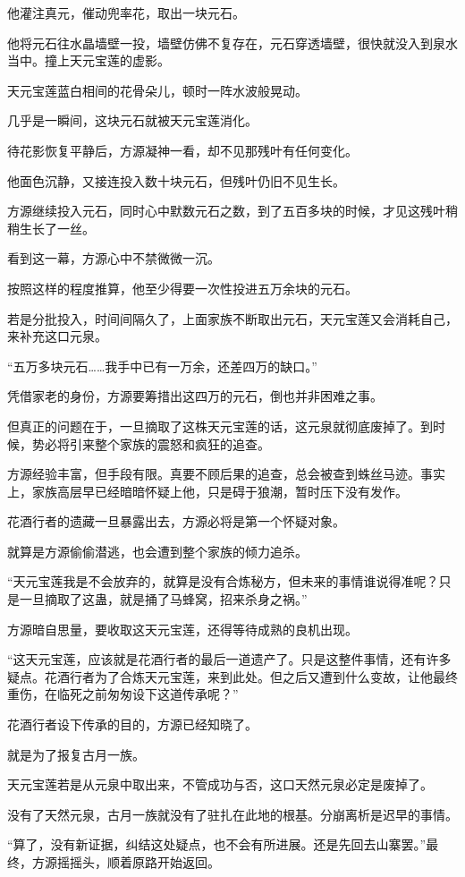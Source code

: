 \begin{this_body}
他灌注真元，催动兜率花，取出一块元石。

他将元石往水晶墙壁一投，墙壁仿佛不复存在，元石穿透墙壁，很快就没入到泉水当中。撞上天元宝莲的虚影。

天元宝莲蓝白相间的花骨朵儿，顿时一阵水波般晃动。

几乎是一瞬间，这块元石就被天元宝莲消化。

待花影恢复平静后，方源凝神一看，却不见那残叶有任何变化。

他面色沉静，又接连投入数十块元石，但残叶仍旧不见生长。

方源继续投入元石，同时心中默数元石之数，到了五百多块的时候，才见这残叶稍稍生长了一丝。

看到这一幕，方源心中不禁微微一沉。

按照这样的程度推算，他至少得要一次性投进五万余块的元石。

若是分批投入，时间间隔久了，上面家族不断取出元石，天元宝莲又会消耗自己，来补充这口元泉。

“五万多块元石……我手中已有一万余，还差四万的缺口。”

凭借家老的身份，方源要筹措出这四万的元石，倒也并非困难之事。

但真正的问题在于，一旦摘取了这株天元宝莲的话，这元泉就彻底废掉了。到时候，势必将引来整个家族的震怒和疯狂的追查。

方源经验丰富，但手段有限。真要不顾后果的追查，总会被查到蛛丝马迹。事实上，家族高层早已经暗暗怀疑上他，只是碍于狼潮，暂时压下没有发作。

花酒行者的遗藏一旦暴露出去，方源必将是第一个怀疑对象。

就算是方源偷偷潜逃，也会遭到整个家族的倾力追杀。

“天元宝莲我是不会放弃的，就算是没有合炼秘方，但未来的事情谁说得准呢？只是一旦摘取了这蛊，就是捅了马蜂窝，招来杀身之祸。”

方源暗自思量，要收取这天元宝莲，还得等待成熟的良机出现。

“这天元宝莲，应该就是花酒行者的最后一道遗产了。只是这整件事情，还有许多疑点。花酒行者为了合炼天元宝莲，来到此处。但之后又遭到什么变故，让他最终重伤，在临死之前匆匆设下这道传承呢？”

花酒行者设下传承的目的，方源已经知晓了。

就是为了报复古月一族。

天元宝莲若是从元泉中取出来，不管成功与否，这口天然元泉必定是废掉了。

没有了天然元泉，古月一族就没有了驻扎在此地的根基。分崩离析是迟早的事情。

“算了，没有新证据，纠结这处疑点，也不会有所进展。还是先回去山寨罢。”最终，方源摇摇头，顺着原路开始返回。


\end{this_body}
